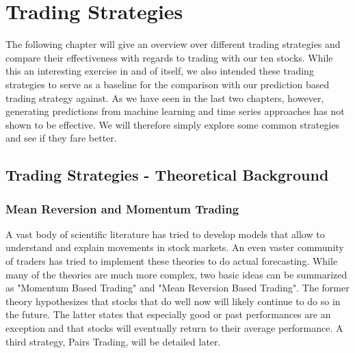 \chapter{Trading Strategies}\label{ch:strategies}
The following chapter will give an overview over different trading strategies and compare their effectiveness with regards to trading with our ten stocks. While this an interesting exercise in and of itself, we also intended these trading strategies to serve as a baseline for the comparison with our prediction based trading strategy against. As we have seen in the last two chapters, however, generating predictions from machine learning and time series approaches has not shown to be effective. We will therefore simply explore some common strategies and see if they fare better. 


\section{Trading Strategies - Theoretical Background}

\subsection{Mean Reversion and Momentum Trading}
A vast body of scientific literature has tried to develop models that allow to understand and explain movements in stock markets. An even vaster community of traders has tried to implement these theories to do actual forecasting. While many of the theories are much more complex, two basic ideas can be summarized as "Momentum Based Trading" and "Mean Reversion Based Trading". The former theory hypothesizes that stocks that do well now will likely continue to do so in the future. The latter states that especially good or past performances are an exception and that stocks will eventually return to their average performance. A third strategy, Pairs Trading, will be detailed later. 

